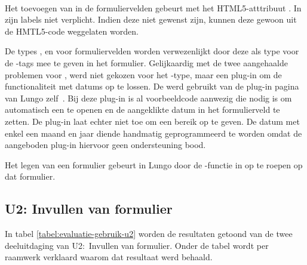  
\paragraph{\lungo} 
Het toevoegen van  in de formuliervelden gebeurt met het HTML5-atttribuut .
In \lungo{} zijn labels niet verplicht.
Indien deze niet gewenst zijn, kunnen deze gewoon uit de HMTL5-code weggelaten worden.

De types ,  en  voor formuliervelden worden verwezenlijkt door deze als type voor de -tags mee te geven in het formulier.
Gelijkaardig met de twee aangehaalde problemen voor \jqm{}, werd niet gekozen voor het -type, maar een plug-in om de functionaliteit met datums op te lossen.
De  werd gebruikt van de plug-in pagina van Lungo zelf~\cite{TapQuo2013b}.
Bij deze plug-in is al voorbeeldcode aanwezig die nodig is om automatisch een  te openen en de aangeklikte datum in het formulierveld te zetten.
De plug-in laat echter niet toe om een bereik op te geven.
De datum met enkel een maand en jaar diende handmatig geprogrammeerd te worden omdat de aangeboden plug-in hiervoor geen ondersteuning bood.

Het legen van een formulier gebeurt in Lungo door de -functie in \js{} op te roepen op dat formulier.


\subsection{U2: Invullen van formulier}
In tabel \ref{tabel:evaluatie-gebruik-u2} worden de resultaten getoond van de twee deeluitdaging van U2:~Invullen van formulier.
Onder de tabel wordt per raamwerk verklaard waarom dat resultaat werd behaald.

\begin{table}[H]
\centering
{}
\caption{Gebruik voor U2: Invullen van formulier}
\label{tabel:evaluatie-gebruik-u2}
\end{table}

